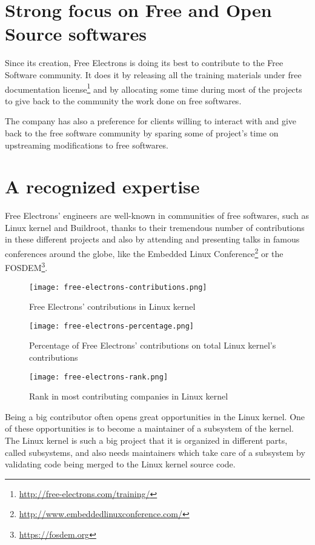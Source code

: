 \section{Strong focus on Free and Open Source softwares}
Since its creation, Free Electrons is doing its best to contribute to the Free Software community. It does it by releasing all the training materials under free documentation license\footnote{\url{http://free-electrons.com/training/}} and by allocating some time during most of the projects to give back to the community the work done on free softwares.

The company has also a preference for clients willing to interact with and give back to the free software community by sparing some of project's time on upstreaming modifications to free softwares.

\section{A recognized expertise}
Free Electrons' engineers are well-known in communities of free softwares, such as Linux kernel and Buildroot, thanks to their tremendous number of contributions in these different projects and also by attending and presenting talks in famous conferences around the globe, like the Embedded Linux Conference\footnote{\url{http://www.embeddedlinuxconference.com/}} or the FOSDEM\footnote{\url{https://fosdem.org}}.

\begin{figure}[H]
  \texttt{[image: free-electrons-contributions.png]}
  \caption{Free Electrons' contributions in Linux kernel}
\end{figure}
\begin{figure}[H]
  \texttt{[image: free-electrons-percentage.png]}
  \caption{Percentage of Free Electrons' contributions on total Linux kernel's contributions}
\end{figure}
\begin{figure}[H]
  \texttt{[image: free-electrons-rank.png]}
  \caption{Rank in most contributing companies in Linux kernel}
\end{figure}

Being a big contributor often opens great opportunities in the Linux kernel. One of these opportunities is to become a maintainer of a subsystem of the kernel. The Linux kernel is such a big project that it is organized in different parts, called subsystems, and also needs maintainers which take care of a subsystem by validating code being merged to the Linux kernel source code.

